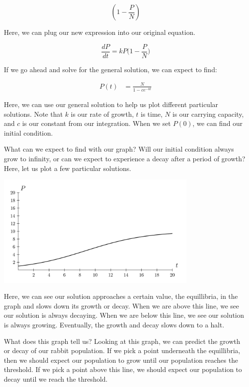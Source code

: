 \documentclass{amsart}
\theoremstyle{definition}
\numberwithin{equation}{section}
\begin{document}
\begin{sansmath}
\[ (1 - \frac{P}{N} )\]

Here, we can plug our new expression into our original equation.

\[ \frac{dP}{dt} = kP \Big(1 - \frac{P}{N} \Big) \]

If we go ahead and solve for the general solution, we can expect to find:

\begin{align*}
  P(t) & = \frac{N}{1 - ce^{-kt}}
\end{align*}

Here, we can use our general solution to help us plot different particular solutions. Note that $k$ is our rate of growth, $t$ is time, $N$ is our carrying capacity, and $c$ is our constant from our integration. When we set $P(0)$, we can find our initial condition.

What can we expect to find with our graph? Will our initial condition always grow to infinity, or can we expect to experience a decay after a period of growth? Here, let us plot a few particular solutions. %

\begin{center}
  \includegraphics[width=10cm]{LogisticSingle}
\end{center}

Here, we can see our solution approaches a certain value, the equillibria, in the graph and slows down its growth or decay. When we are above this line, we see our solution is always decaying. When we are below this line, we see our solution is always growing. Eventually, the growth and decay slows down to a halt.

What does this graph tell us? Looking at this graph, we can predict the growth or decay of our rabbit population. If we pick a point underneath the equillibria, then we should expect our population to grow until our population reaches the threshold. If we pick a point above this line, we should expect our population to decay until we reach the threshold.


\end{sansmath}
\end{document}
